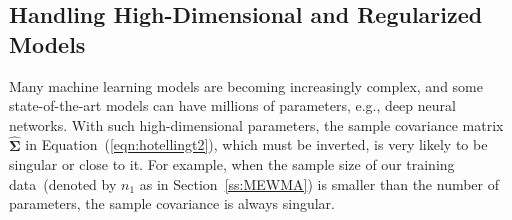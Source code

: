 \documentclass[twoside,11pt]{article}
\begin{document}



\subsection{Handling High-Dimensional and Regularized Models}
\label{ss:high_dim_score}
Many machine learning models are becoming increasingly complex, and some state-of-the-art models can have millions of parameters, e.g., deep neural networks. With such high-dimensional parameters, the sample covariance matrix $\widehat {\bm { \Sigma}}$ in Equation~(\ref{eqn:hotellingt2}), which must be inverted, is very likely to be singular or close to it. For example, when the sample size of our training data~(denoted by $n_1$ as in Section~\ref{ss:MEWMA}) is smaller than the number of parameters, the sample covariance is always singular. 
\end{document}
